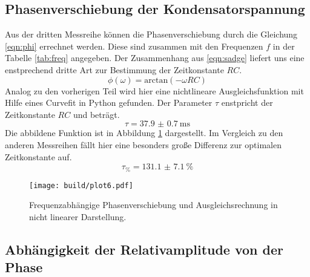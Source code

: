 \subsection{Phasenverschiebung der Kondensatorspannung}
Aus der dritten Messreihe können die Phasenverschiebung durch die Gleichung \eqref{eqn:phi} errechnet werden. Diese sind zusammen
mit den Frequenzen $f$ in der Tabelle \ref{tab:freq} angegeben.
Der Zusammenhang aus \eqref{eqn:sadge} liefert uns eine enstprechend dritte Art zur Bestimmung der Zeitkonstante $RC$.
\begin{equation}
    \phi(\omega) = \text{arctan}(-\omega RC)
\end{equation}
Analog zu den vorherigen Teil wird hier eine nichtlineare Ausgleichsfunktion mit Hilfe eines Curvefit in Python gefunden.
Der Parameter $\tau$ enstpricht der Zeitkonstante $RC$ und beträgt.
\begin{equation}
    \tau = \SI{37.9(07)}{\ms}
\end{equation}
Die abbildene Funktion ist in Abbildung \ref{fig:plttausend} dargestellt. Im Vergleich zu den anderen Messreihen fällt hier eine besonders
große Differenz zur optimalen Zeitkonstante auf.
\begin{equation*}
    \label{eqn:Mp1kompletterMuell}
    \tau_{\si{\percent}} = \SI{131.1(71)}{\percent}
\end{equation*}
\begin{figure}
    \centering 
    \texttt{[image: build/plot6.pdf]}
    \caption{Frequenzabhängige Phasenverschiebung und Ausgleichsrechnung in nicht linearer Darstellung.}
    \label{fig:plttausend}
\end{figure} 

\subsection{Abhängigkeit der Relativamplitude von der Phase}